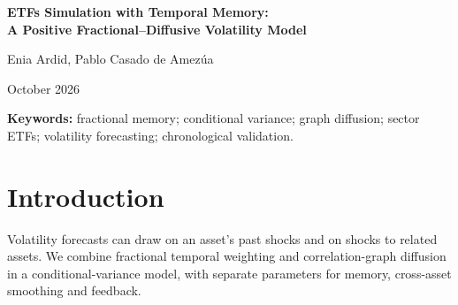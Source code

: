 \documentclass[12pt,a4paper]{article}
\begin{document}
\begin{center}
{\Large\bfseries ETFs Simulation with Temporal Memory:\\[0.25em]
A Positive Fractional--Diffusive Volatility Model\par}
\vspace{0.4cm}
{\large Enia Ardid, Pablo Casado de Amez\'ua\par}
\vspace{0.2cm}
{\small October 2026\par}
\end{center}
\vspace{0.2cm}
\begin{abstract}
We develop a conditional-variance model that weights past squared shocks
with a finite fractional kernel and pools them across assets through a
positive correlation-graph resolvent. We derive its positivity and
fixed-parameter moment properties, exact multi-step variance forecasts, and
the effective memory of a persistent asymmetric extension. The empirical study covers the
S\&P~500, eleven sector ETFs and eight country ETFs, with 186 origins per panel
during 2023--2026 and horizons of 1, 5 and 21 observations. Persistence,
asymmetry and multi-horizon selection improve the initial specification in all six US panel--horizon
comparisons. A fixed 50:50 combination with GJR-GARCH lowers pooled QLIKE
relative to the refined fractional model and FIGARCH in all nine comparisons.
Against GJR alone, it has lower loss in three; all nine paired nominal 95\%
block-bootstrap intervals include zero at both block lengths. The study
therefore establishes neither superiority nor equivalence to GJR. Diffusion
has mixed value, and the ranking against weighted Network GARCH reverses
between sectors and countries. Evaluation uses retrospective adjusted-price
snapshots downloaded in October 2026; chronological row access does not
reconstruct historical data availability.
The shared temporal kernel and graph operator make the model's impulse
response tractable, while the ablations show where these restrictions help
or hinder forecasting.
\end{abstract}
\vspace{0.3cm}
\textbf{Keywords:} fractional memory; conditional variance; graph diffusion;
sector ETFs; volatility forecasting; chronological validation.

\section{Introduction}
Volatility forecasts can draw on an asset's past shocks and on shocks to
related assets. We combine fractional temporal weighting and correlation-graph
diffusion in a conditional-variance model, with separate parameters for memory,
cross-asset smoothing and feedback.
\end{document}
